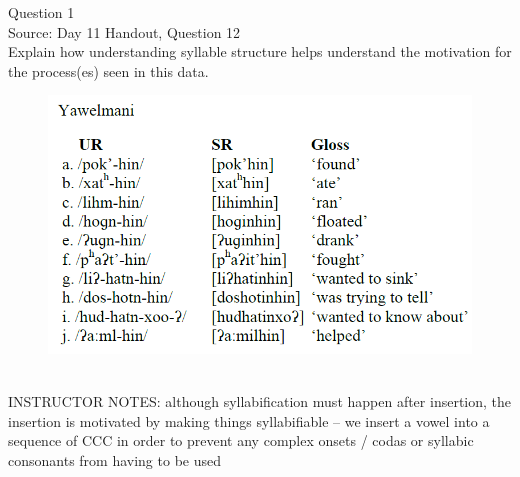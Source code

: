\documentclass[12pt]{article}
\begin{document}
\begin{center}
\textbf{{\color{violet}{\HUGE Wednesday, 24 June 2020\\}}}

\textbf{{\color{violet}{\HUGE ALL EXAMS (with notes)\\}}}

\end{center}
\newpage

\begin{center}
\textbf{{\color{blue}{\HUGE START OF EXAM\\}}}

\textbf{{\color{blue}{\HUGE Student ID: 3684\\}}}

\textbf{{\color{blue}{\HUGE 9:30 - 9:50 AM\\}}}

\end{center}
\newpage

{\large Question 1}\\

Source: Day 11 Handout, Question 12\\

Explain how understanding syllable structure helps understand the motivation for the process(es) seen in this data.\\

\begin{figure}[H]
\includegraphics{../images/yawelmani.png}
\end{figure}

~\\
INSTRUCTOR NOTES: although syllabification must happen after insertion, the insertion is motivated by making things syllabifiable -- we insert a vowel into a sequence of CCC in order to prevent any complex onsets / codas or syllabic consonants from having to be used
\end{document}
